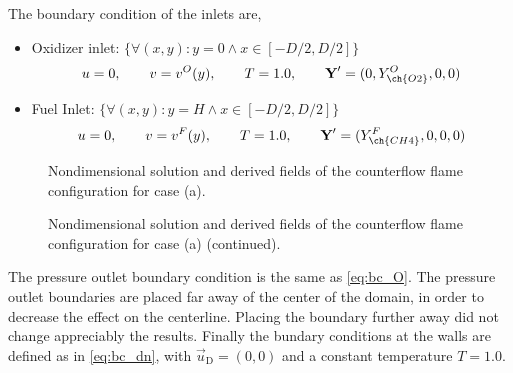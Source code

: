 The boundary condition of the inlets are,
\begin{itemize}
	\item Oxidizer inlet: $\{\forall (x,y): y = 0 \land x \in [-D/2, D/2]\}$\\
	\begin{equation*}
		u = 0,\qquad v= v^O(y), \qquad T = 1.0, \qquad \vec{Y}' = (0,Y^O_{\ch{O2}},0,0)
	\end{equation*}
	\item Fuel Inlet: $\{\forall (x,y): y = H \land x \in [-D/2, D/2]\} $ \\
	\begin{equation*}
		u = 0,\qquad v= v^F(y), \qquad T = 1.0, \qquad \vec{Y}' = (Y^F_{\ch{CH4}},0,0,0)
	\end{equation*}
\end{itemize}
 
\begin{figure}[p]
	\centering
	\pgfplotsset{width=0.73\textwidth, compat=1.3}
	\caption{Nondimensional solution and derived fields of the counterflow flame configuration for case (a).} \label{fig:CoFlowFlameFig1}
\end{figure}
\begin{figure}[p]
	\ContinuedFloat
	\centering
	\pgfplotsset{width=0.73\textwidth, compat=1.3}		
	\caption{Nondimensional solution and derived fields of the counterflow flame configuration for case (a) (continued).}%
\end{figure} 


The pressure outlet boundary condition is the same as \cref{eq:bc_O}. The pressure outlet boundaries are placed far away of the center of the domain, in order to decrease the effect on the centerline. Placing the boundary further away did not change appreciably the results. Finally the bundary conditions at the walls are defined as in \cref{eq:bc_dn}, with $\vec{u}_{\text{D}} = (0,0)$ and a constant temperature $T = 1.0$.          
 
